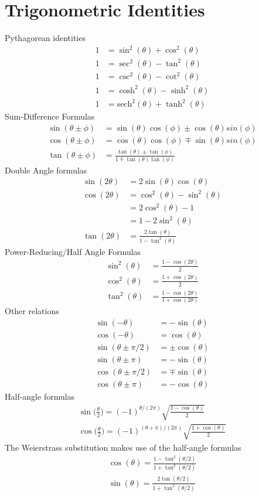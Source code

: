 \section{Trigonometric Identities}
\begin{multicols}{2}
Pythagorean identities
\begin{align}
1 &= \sin^2(\theta)+\cos^2(\theta)\\
1 &= \sec^2(\theta)-\tan^2(\theta) \\
1 &= \csc^2(\theta)-\cot^2(\theta) \\
1 &= \cosh^2(\theta)-\sinh^2(\theta) \\
1 &= \textrm{sech}^2(\theta)+\tanh^2(\theta)
\end{align}
Sum-Difference Formulas
\begin{align}
\sin(\theta \pm \phi) &= \sin(\theta)\cos(\phi)\pm \cos(\theta)sin(\phi) \\
\cos(\theta \pm \phi) &= \cos(\theta)\cos(\phi)\mp \sin(\theta)sin(\phi) \\
\tan(\theta \pm \phi) &= \frac{\tan(\theta)\pm \tan (\phi)}{1 \mp \tan(\theta)\tan(\phi)}
\end{align}
Double Angle formulas
\begin{align}
\sin(2\theta) &= 2\sin(\theta)\cos(\theta) \\
\cos(2\theta) &= \cos^2(\theta)-\sin^2(\theta)\\
&= 2\cos^2(\theta)-1 \\
&= 1 - 2\sin^2(\theta) \\
\tan(2\theta) &= \frac{2 \tan(\theta)}{1-\tan^2(\theta)}
\end{align}
Power-Reducing/Half Angle Formulas
\begin{align}
\sin^2(\theta) &= \frac{1-\cos(2\theta)}{2}\\
\cos^2(\theta) &= \frac{1+\cos(2\theta)}{2}\\
\tan^2(\theta) &= \frac{1-\cos(2\theta)}{1+\cos(2\theta)}
\end{align}
Other relations
\begin{align}
\sin(-\theta) &=-\sin(\theta) \\
\cos(-\theta) &= \cos(\theta) \\
\sin(\theta\pm \pi/2) &= \pm \cos(\theta) \\
\sin(\theta\pm \pi) &= - \sin(\theta) \\
\cos(\theta\pm \pi/2) &= \mp \sin(\theta) \\
\cos(\theta\pm \pi) &= - \cos(\theta) 
\end{align}
Half-angle formulas
\begin{align}
\sin\bigg(\frac{\theta}{2}\bigg)=(-1)^{\theta/(2\pi)}\sqrt{\frac{1-\cos(\theta)}{2}} \\
\cos\bigg(\frac{\theta}{2}\bigg)=(-1)^{(\theta+\pi)/(2\pi)}\sqrt{\frac{1+\cos(\theta)}{2}}
\end{align}
The Weierstrass substitution makes use of the half-angle formulas 
\begin{align}
\cos(\theta)=\frac{1-\tan^2(\theta/2)}{1+\tan^2(\theta/2)} \\
\sin(\theta)=\frac{2\tan(\theta/2)}{1+\tan^2(\theta/2)}
\end{align}
\end{multicols}
